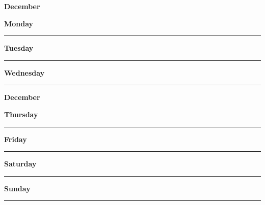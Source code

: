 \newpage

\textbf{\Large{December} \hfill \Large{}}
\vspace{0.3cm}

\begin{daybox}
 \textbf{Monday} \\
\rule{\linewidth}{0.02cm}
\end{daybox}

\begin{daybox}
\textbf{Tuesday} \\
\rule{\linewidth}{0.02cm}
\end{daybox}

\begin{daybox}
\textbf{Wednesday} \\
\rule{\linewidth}{0.02cm}
\end{daybox}

\newpage

\textbf{\Large{December} \hfill \Large{}}
\vspace{0.3cm}

\begin{daybox}
\textbf{Thursday} \\
\rule{\linewidth}{0.02cm}
\end{daybox}

\begin{daybox}
\textbf{Friday} \\
\rule{\linewidth}{0.02cm}
\end{daybox}

\begin{weekendbox}
\textbf{Saturday} \\
\rule{\linewidth}{0.02cm}
\tcblower
{}
\textbf{Sunday} \\
\rule{\linewidth}{0.02cm}
\end{weekendbox}